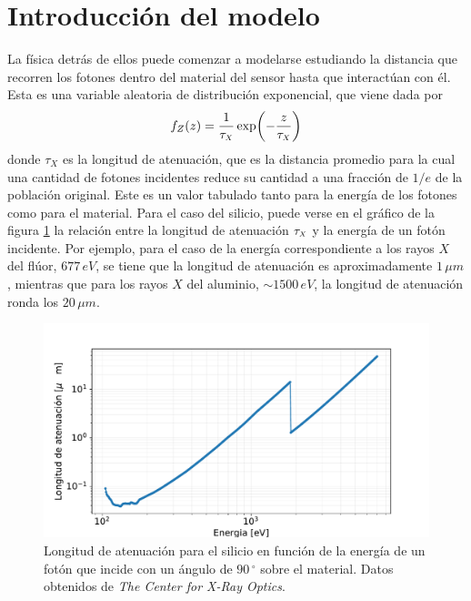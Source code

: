 \section{Introducción del modelo}
\noindent La física detrás de ellos puede comenzar a modelarse estudiando la distancia que recorren los fotones dentro del material del sensor hasta que interactúan con él. Esta es una variable aleatoria de distribución exponencial, que viene dada por
\begin{equation*}
    f_{Z}(z) = \frac{1}{\tau_{\scaleto{X}{4pt}}}\exp(-\frac{z}{\tau_{\scaleto{X}{4pt}}})
\end{equation*}
donde $\tau_{X}$ es la longitud de atenuación, que es la distancia promedio para la cual una cantidad de fotones incidentes reduce su cantidad a una fracción de $1/e$ de la población original. Este es un valor tabulado tanto para la energía de los fotones como para el material. Para el caso del silicio, puede verse en el gráfico de la figura \ref{fig:Attenuation} la relación entre la longitud de atenuación $\tau_{\scaleto{X}{4pt}}$ y la energía de un fotón incidente. Por ejemplo, para el caso de la energía correspondiente a los rayos $X$ del flúor, $677\,\si{eV}$, se tiene que la longitud de atenuación es aproximadamente $1\,\si{\mu m}$, mientras que para los rayos $X$ del aluminio, $\sim 1500\,\si{eV}$, la longitud de atenuación ronda los $20\,\si{\mu m}$.
\begin{figure}[h]
    \centering
        \includegraphics[scale=0.5]{Figs/AttenuationLength.pdf}
    \caption{\footnotesize{Longitud de atenuación para el silicio en función de la energía de un fotón que incide con un ángulo de $90\,^{\circ}$ sobre el material. Datos obtenidos de \textit{The Center for X-Ray Optics}\cite{AttenuationLength}.}}
    \label{fig:Attenuation}
\end{figure}

